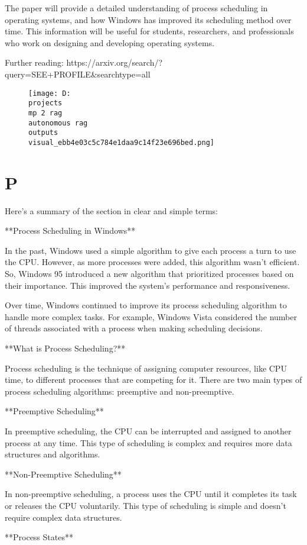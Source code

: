 \documentclass[12pt,a4paper]{article}
\begin{document}
The paper will provide a detailed understanding of process scheduling in operating systems, and how Windows has improved its scheduling method over time. This information will be useful for students, researchers, and professionals who work on designing and developing operating systems.

Further reading: https://arxiv.org/search/?query=SEE+PROFILE&searchtype=all
\begin{figure}[h]
\centering
\texttt{[image: D:\\projects\\mp 2 rag\\autonomous rag\\outputs\\visual\_ebb4e03c5c784e1daa9c14f23e696bed.png]}
\end{figure}
\section{P}
Here's a summary of the section in clear and simple terms:

**Process Scheduling in Windows**

In the past, Windows used a simple algorithm to give each process a turn to use the CPU. However, as more processes were added, this algorithm wasn't efficient. So, Windows 95 introduced a new algorithm that prioritized processes based on their importance. This improved the system's performance and responsiveness.

Over time, Windows continued to improve its process scheduling algorithm to handle more complex tasks. For example, Windows Vista considered the number of threads associated with a process when making scheduling decisions.

**What is Process Scheduling?**

Process scheduling is the technique of assigning computer resources, like CPU time, to different processes that are competing for it. There are two main types of process scheduling algorithms: preemptive and non-preemptive.

**Preemptive Scheduling**

In preemptive scheduling, the CPU can be interrupted and assigned to another process at any time. This type of scheduling is complex and requires more data structures and algorithms.

**Non-Preemptive Scheduling**

In non-preemptive scheduling, a process uses the CPU until it completes its task or releases the CPU voluntarily. This type of scheduling is simple and doesn't require complex data structures.

**Process States**
\end{document}
